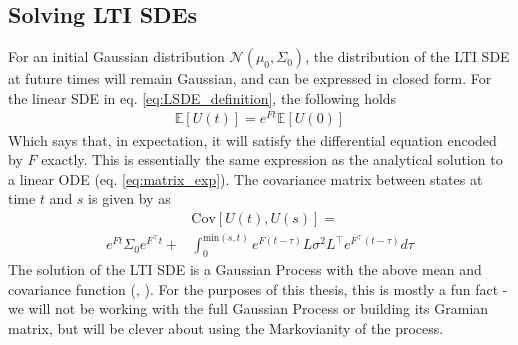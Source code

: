 \subsection*{Solving LTI SDEs}
For an initial Gaussian distribution $\mathcal{N}(\mu_0, \Sigma_0)$, the distribution of the LTI SDE at future times will remain Gaussian, and can be expressed in closed form. For the linear SDE in eq. \ref{eq:LSDE_definition}, the following holds
\begin{align}\label{eq:SDE_mean}
    \mathbb{E}[U(t)] = e^{Ft}\mathbb{E}[U(0)]
\end{align}
Which says that, in expectation, it will satisfy the differential equation encoded by $F$ exactly. This is essentially the same expression as the analytical solution to a linear ODE (eq. \ref{eq:matrix_exp}). The covariance matrix between states at time $t$ and $s$ is given by \cite{invention_of_ODE_solver} as
\begin{align}\label{eq:SDE_cov}
    &\text{Cov}[U(t), U(s)] = \nonumber \\ e^{Ft}\Sigma_0e^{F^\top t} 
    + &\int_0^{\text{min}(s,t)} e^{F(t-\tau)}L\sigma^2L^\top e^{F^\top(t-\tau)} d\tau
\end{align}
The solution of the LTI SDE is a Gaussian Process with the above mean and covariance function (\cite{probnum}, \cite{gp_Rasmussen}). For the purposes of this thesis, this is mostly a fun fact - we will not be working with the full Gaussian Process or building its Gramian matrix, but will be clever about using the Markovianity of the process.
